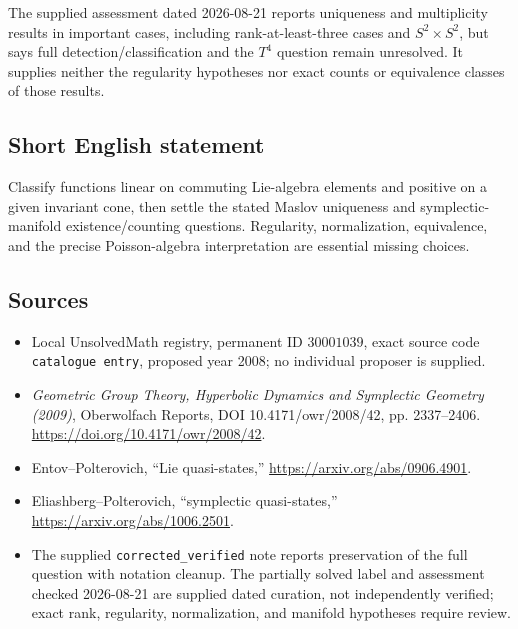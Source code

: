\documentclass[11pt]{article}
\begin{document}
The supplied assessment dated 2026-08-21 reports uniqueness and multiplicity results in important cases, including rank-at-least-three cases and \(S^2\times S^2\), but says full detection/classification and the \(T^4\) question remain unresolved. It supplies neither the regularity hypotheses nor exact counts or equivalence classes of those results.
\subsection{Short English statement}
Classify functions linear on commuting Lie-algebra elements and positive on a given invariant cone, then settle the stated Maslov uniqueness and symplectic-manifold existence/counting questions. Regularity, normalization, equivalence, and the precise Poisson-algebra interpretation are essential missing choices.
\subsection{Sources}
\begin{itemize}
\item Local UnsolvedMath registry, permanent ID \(30001039\), exact source code \texttt{catalogue entry}, proposed year 2008; no individual proposer is supplied.
\item \emph{Geometric Group Theory, Hyperbolic Dynamics and Symplectic Geometry (2009)}, Oberwolfach Reports, DOI 10.4171/owr/2008/42, pp. 2337--2406. \url{https://doi.org/10.4171/owr/2008/42}.
\item Entov--Polterovich, ``Lie quasi-states,'' \url{https://arxiv.org/abs/0906.4901}.
\item Eliashberg--Polterovich, ``symplectic quasi-states,'' \url{https://arxiv.org/abs/1006.2501}.
\item The supplied \texttt{corrected\_verified} note reports preservation of the full question with notation cleanup. The partially solved label and assessment checked 2026-08-21 are supplied dated curation, not independently verified; exact rank, regularity, normalization, and manifold hypotheses require review.
\end{itemize}
\end{document}
